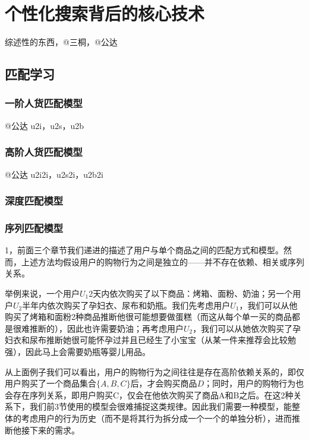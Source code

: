 
\chapter{个性化搜索背后的核心技术}
\thispagestyle{empty}

\setlength{\fboxrule}{0pt}\setlength{\fboxsep}{0cm}
\noindent\shadowbox{
\begin{tcolorbox}[arc=0mm,colback=lightblue,colframe=darkblue,title=学习目标与要求]

\end{tcolorbox}}
\setlength{\fboxrule}{1pt}\setlength{\fboxsep}{4pt} 

综述性的东西，@三桐，@公达

\section{匹配学习}
	
\subsection{一阶人货匹配模型} 
	@公达 u2i，u2s，u2b 

\subsection{高阶人货匹配模型} 
	@公达 u2i2i，u2s2i，u2b2i 

\subsection{深度匹配模型} 

\subsection{序列匹配模型} 
1，前面三个章节我们递进的描述了用户与单个商品之间的匹配方式和模型。然而，上述方法均假设用户的购物行为之间是独立的——并不存在依赖、相关或序列关系。

举例来说，一个用户$U_1$2天内依次购买了以下商品：烤箱、面粉、奶油；另一个用户$U_2$半年内依次购买了孕妇衣、尿布和奶瓶。我们先考虑用户$U_1$，我们可以从他购买了烤箱和面粉2种商品推断他很可能想要做蛋糕（而这从每个单一买的商品都是很难推断的），因此也许需要奶油；再考虑用户$U_2$，我们可以从她依次购买了孕妇衣和尿布推断她很可能怀孕过并且已经生了小宝宝（从某一件来推荐会比较勉强），因此马上会需要奶瓶等婴儿用品。

从上面例子我们可以看出，用户的购物行为之间往往是存在高阶依赖关系的，即仅用户购买了一个商品集合$\{A, B, C\}$后，才会购买商品$D$；同时，用户的购物行为也会存在序列关系，即用户购买C，仅会在他依次购买了商品A和B之后。在这2种关系下，我们前3节使用的模型会很难捕捉这类规律。因此我们需要一种模型，能整体的考虑用户的行为历史（而不是将其行为拆分成一个一个的单独分析），进而推断他接下来的需求。

